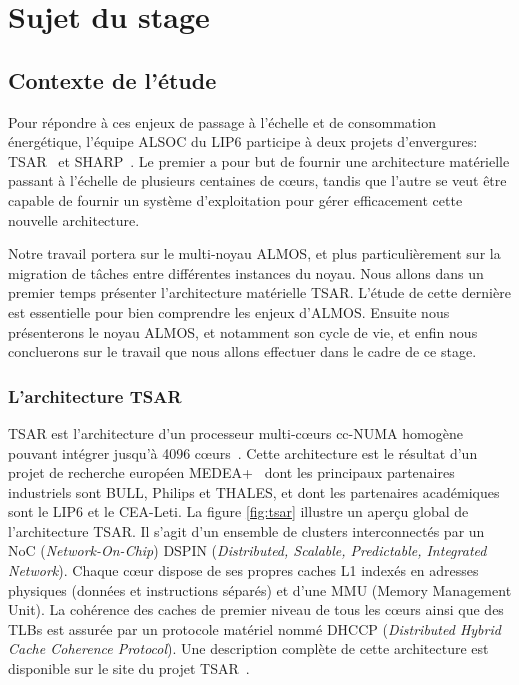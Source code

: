\chapter{Sujet du stage}
\label{chap:subject}

  \section{Contexte de l'étude}
    Pour répondre à ces enjeux de passage à l'échelle et de consommation
    énergétique, l'équipe ALSOC du LIP6 participe à deux projets d'envergures:
    TSAR~\cite{tsar2008} et SHARP~\cite{sharp2012}. Le premier a pour but de
    fournir une architecture matérielle passant à l'échelle de plusieurs
    centaines de c\oe urs, tandis que l'autre se veut être capable de fournir un
    système d'exploitation pour gérer efficacement cette nouvelle architecture.

    Notre travail portera sur le multi-noyau ALMOS, et plus particulièrement sur
    la migration de tâches entre différentes instances du noyau. Nous allons
    dans un premier temps présenter l'architecture matérielle TSAR. L'étude de
    cette dernière est essentielle pour bien comprendre les enjeux
    d'ALMOS. Ensuite nous présenterons le noyau ALMOS, et notamment son cycle de
    vie, et enfin nous concluerons sur le travail que nous allons effectuer dans
    le cadre de ce stage.
  

    \subsection{L'architecture TSAR}
    \label{sec:tsar}

      TSAR est l'architecture d’un processeur multi-c\oe urs cc-NUMA homogène
      pouvant intégrer jusqu’à 4096 c\oe urs~\cite{greiner2009tsar}. Cette
      architecture est le résultat d’un projet de recherche européen
      MEDEA+~\cite{tsar2008} dont les principaux partenaires industriels sont
      BULL, Philips et THALES, et dont les partenaires académiques sont le LIP6
      et le CEA-Leti. La figure \ref{fig:tsar} illustre un aperçu global de
      l'architecture TSAR. Il s'agit d'un ensemble de clusters interconnectés
      par un NoC (\textit{Network-On-Chip}) DSPIN (\textit{Distributed,
        Scalable, Predictable, Integrated Network}). Chaque c\oe ur dispose de
      ses propres caches L1 indexés en adresses physiques (données et
      instructions séparés) et d'une MMU (Memory Management Unit). La cohérence
      des caches de premier niveau de tous les c\oe urs ainsi que des TLBs est
      assurée par un protocole matériel nommé DHCCP (\textit{Distributed Hybrid
        Cache Coherence Protocol}). Une description complète de cette
      architecture est disponible sur le site du projet TSAR~\cite{tsar2008web}.


